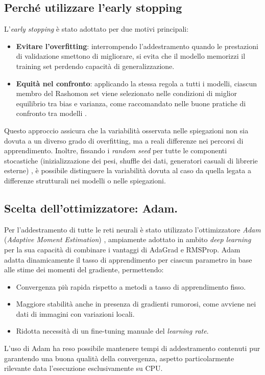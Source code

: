 \documentclass{article}
\begin{document}
\subsection{Perché utilizzare l’early stopping}
L’\emph{early stopping} \citep{prechelt1998early} è stato adottato per due
motivi principali:
\begin{itemize}
      \item \textbf{Evitare l’overfitting}: interrompendo l’addestramento quando le prestazioni di validazione smettono di migliorare, si evita che il modello memorizzi il training set perdendo capacità di generalizzazione.
      \item \textbf{Equità nel confronto}: applicando la stessa regola a tutti i modelli, ciascun membro del Rashomon set viene selezionato nelle condizioni di miglior equilibrio tra bias e varianza, come raccomandato nelle buone pratiche di confronto tra modelli \citep{goodfellow2016deep}.
\end{itemize}

Questo approccio assicura che la variabilità osservata nelle spiegazioni non
sia dovuta a un diverso grado di overfitting, ma a reali differenze nei
percorsi di apprendimento. Inoltre, fissando i \emph{random seed} per tutte le
componenti stocastiche (inizializzazione dei pesi, shuffle dei dati, generatori
casuali di librerie esterne) \citep{reimers2017reporting}, è possibile
distinguere la variabilità dovuta al caso da quella legata a differenze
strutturali nei modelli o nelle spiegazioni.

\subsection{Scelta dell’ottimizzatore: Adam.}
Per l’addestramento di tutte le reti neurali è stato utilizzato l’ottimizzatore
\emph{Adam} (\emph{Adaptive Moment Estimation}) \citep{kingma2014adam},
ampiamente adottato in ambito \emph{deep learning} per la sua capacità di
combinare i vantaggi di AdaGrad e RMSProp. Adam adatta dinamicamente il tasso
di apprendimento per ciascun parametro in base alle stime dei momenti del
gradiente, permettendo:
\begin{itemize}
      \item Convergenza più rapida rispetto a metodi a tasso di apprendimento fisso.
      \item Maggiore stabilità anche in presenza di gradienti rumorosi, come avviene nei
            dati di immagini con variazioni locali.
      \item Ridotta necessità di un fine-tuning manuale del \emph{learning rate}.
\end{itemize}
L’uso di Adam ha reso possibile mantenere tempi di addestramento contenuti pur garantendo
una buona qualità della convergenza, aspetto particolarmente rilevante data
l’esecuzione esclusivamente su CPU.
\end{document}
